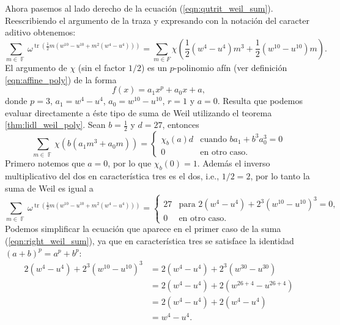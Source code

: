 \documentclass[a4paper, 11pt]{article}
\DeclareMathOperator{\F}{\mathbb{F}}
\DeclareMathOperator{\tr}{tr}
\begin{document}
  Ahora pasemos al lado derecho de la ecuación
  (\ref{eqn:qutrit_weil_sum}). Reescribiendo el argumento de
  la traza y expresando con la notación del caracter aditivo
  obtenemos:
  \begin{equation}
    \sum_{m \in \F}^{} \omega^{\tr\left( \frac{1}{2} m\left(
    w^{10}-u^{10} + m^2(w^{4}-u^{4})\right)  \right) }
    = 
    \sum_{m \in F}^{} \chi\left(
      \frac{1}{2}
      \left( w^{4} - u^{4} \right) m^3
      + \frac{1}{2}
      \left( w^{10} - u^{10} \right) m 
    \right).
  \end{equation}
  El argumento de $\chi$ (sin el factor $1 / 2$) es un
  $p$-polinomio afín (ver definición \ref{eqn:affine_poly})
  de la forma
  \begin{equation}
    f(x) = a_1 x^{p} + a_0 x + a,
  \end{equation}
  donde $p = 3$, $a_1 = w^{4} - u^{4}$,  $a_0 = w^{10} -
  u^{10}$, $r = 1$ y $a = 0$. Resulta que podemos evaluar
  directamente a éste tipo de suma de Weil utilizando el
  teorema \ref{thm:lidl_weil_poly}. Sean $b = \frac{1}{2}$ y
  $d = 27$, entonces
  \begin{equation}
    \sum_{m \in \F}^{} \chi\left(
      b \left(
        a_1 m^{3} + a_0 m
      \right)
    \right)
    = 
    \begin{cases}
      \chi_{b}(a) d & \text{cuando } b a_1 + b^{3} a_0^{3} =
      0 \\
      0 & \text{en otro caso}.
    \end{cases}
  \end{equation}
  Primero notemos que $a = 0$, por lo que $\chi_b(0) = 1$.
  Además el inverso multiplicativo del dos en característica
  tres es el dos, i.e., $1 / 2 = 2$, por lo tanto la suma de
  Weil es igual a
  \begin{equation}
    \label{eqn:right_weil_sum}
    \sum_{m \in \F}^{} \omega^{\tr\left( \frac{1}{2} m\left(
    w^{10}-u^{10} + m^2(w^{4}-u^{4})\right)  \right) }
    =
    \begin{cases}
      27 & \text{para } 2\left( w^{4}-u^{4} \right) +
      2^{3} \left( w^{10} - u^{10} \right)^{3} = 0, \\
      0 & \text{en otro caso}.
    \end{cases}
  \end{equation}
  Podemos simplificar la ecuación que aparece en el primer
  caso de la suma (\ref{eqn:right_weil_sum}), ya que en
  característica tres se satisface la identidad $(a+b)^{p} =
  a^{p} + b^{p}$:
  \begin{align}
    2\left( w^{4}-u^{4} \right) + 2^{3} \left( w^{10} -
    u^{10} \right) ^{3}
    &= 2 \left(w^{4} - u^{4}\right) + 2^{3} \left( w^{30}
    - u^{30} \right) \\
    &= 2\left(w^{4} - u^{4}\right) + 2\left(w^{26 + 4} -
      u^{26 + 4}\right) \\
    &= 2\left(w^{4} - u^{4}\right) + 2\left(w^{4} -
    u^{4}\right) \\
    &= w^{4} - u^{4}.
  \end{align}
\end{document}
